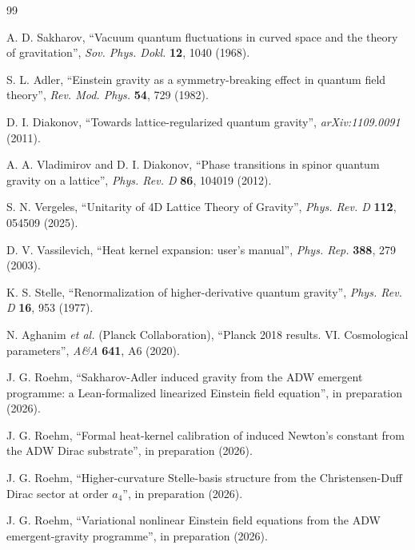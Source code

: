 \documentclass[twocolumn]{revtex4-2}
\begin{document}
\begin{thebibliography}{99}

A. D. Sakharov, ``Vacuum quantum fluctuations in curved space and the
theory of gravitation'', \emph{Sov. Phys. Dokl.} \textbf{12},
1040 (1968).

S. L. Adler, ``Einstein gravity as a symmetry-breaking effect in
quantum field theory'', \emph{Rev. Mod. Phys.} \textbf{54}, 729
(1982).

D. I. Diakonov, ``Towards lattice-regularized quantum gravity'',
\emph{arXiv:1109.0091} (2011).

A. A. Vladimirov and D. I. Diakonov, ``Phase transitions in spinor
quantum gravity on a lattice'', \emph{Phys. Rev. D} \textbf{86},
104019 (2012).

S. N. Vergeles, ``Unitarity of 4D Lattice Theory of Gravity'',
\emph{Phys. Rev. D} \textbf{112}, 054509 (2025).

D. V. Vassilevich, ``Heat kernel expansion: user's manual'',
\emph{Phys. Rep.} \textbf{388}, 279 (2003).

K. S. Stelle, ``Renormalization of higher-derivative quantum
gravity'', \emph{Phys. Rev. D} \textbf{16}, 953 (1977).

N. Aghanim \emph{et al.} (Planck Collaboration), ``Planck 2018
results. VI. Cosmological parameters'', \emph{A\&A} \textbf{641},
A6 (2020).

J. G. Roehm, ``Sakharov-Adler induced gravity from the ADW emergent
programme: a Lean-formalized linearized Einstein field equation'',
in preparation (2026).

J. G. Roehm, ``Formal heat-kernel calibration of induced Newton's
constant from the ADW Dirac substrate'', in preparation (2026).

J. G. Roehm, ``Higher-curvature Stelle-basis structure from the
Christensen-Duff Dirac sector at order $a_{4}$'', in preparation
(2026).

J. G. Roehm, ``Variational nonlinear Einstein field equations from
the ADW emergent-gravity programme'', in preparation (2026).

\end{thebibliography}
\end{document}
